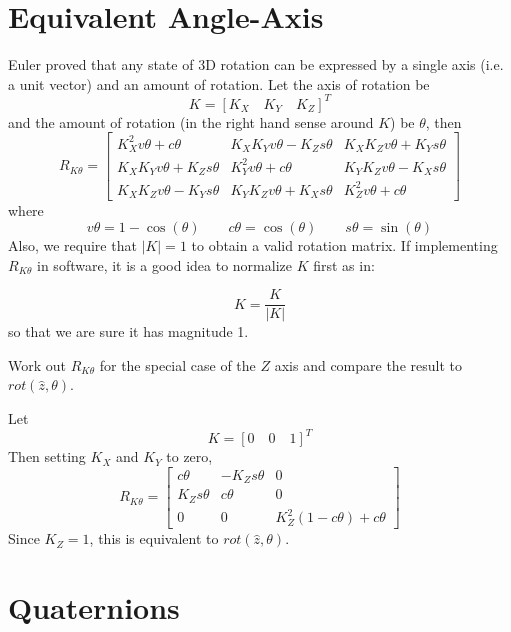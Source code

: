 \section{Equivalent Angle-Axis}\label{EquivAngleAxis}

Euler proved that any state of 3D rotation can be expressed by a single axis (i.e. a unit vector) and an amount of rotation.
Let the axis of rotation be
\[
K = [K_X\quad K_Y\quad K_Z]^T
\]
and the amount of rotation (in the right hand sense around $K$) be $\theta$,
then
\[
R_{K\theta} =
\begin{bmatrix}
K_X^2v\theta+ c\theta		& K_XK_Yv\theta-K_Zs\theta		&K_XK_Zv\theta+K_Ys\theta \\
K_XK_Yv\theta+K_Zs\theta	& K_Y^2v\theta+c\theta			&K_YK_Zv\theta-K_Xs\theta \\
K_XK_Zv\theta-K_Ys\theta	& K_YK_Zv\theta+K_Xs\theta		&K_Z^2v\theta+c\theta
\end{bmatrix}
\]
where
\[
v\theta = 1-\cos(\theta) \qquad c\theta = \cos(\theta) \qquad s\theta=\sin(\theta)
\]
Also, we require that $|K|=1$ to obtain a valid rotation matrix.   If implementing 
$R_{K\theta}$ in software, it is a good idea to normalize $K$ first as in:

\[
K = \frac{K}{|K|}
\]
so that we are sure it has magnitude 1. 

\begin{ExampleSmall}
Work out $R_{K\theta}$ for the special case of the $Z$ axis and compare the result to $rot(\hat{z}, \theta)$.

Let
\[
K = [0\quad0\quad1]^T
\]
Then setting $K_X$ and $K_Y$ to zero,
\[
R_{K\theta} =
\begin{bmatrix}
c\theta				& -K_Zs\theta				& 0 \\
K_Zs\theta			&     c\theta				& 0 \\
0				& 0					&K_Z^2(1-c\theta)+c\theta
\end{bmatrix}
\]
Since $K_Z=1$, this is equivalent to $rot(\hat{z}, \theta)$.
\end{ExampleSmall}


\section{Quaternions}\label{QuaternionSection}


